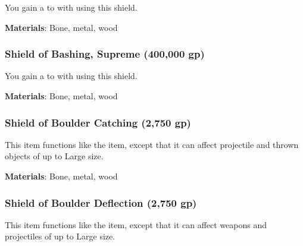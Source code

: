 You gain a   to  with  using this shield.



\vspace{0.25em}
\textbf{Materials}: Bone, metal, wood


\lowercase{\hypertarget{item:Shield of Bashing, Supreme}{}}\label{item:Shield of Bashing, Supreme}
\hypertarget{item:Shield of Bashing, Supreme}{\subsubsection{Shield of Bashing, Supreme\hfill{} (400,000 gp)}}

You gain a   to  with  using this shield.



\vspace{0.25em}
\textbf{Materials}: Bone, metal, wood


\lowercase{\hypertarget{item:Shield of Boulder Catching}{}}\label{item:Shield of Boulder Catching}
\hypertarget{item:Shield of Boulder Catching}{\subsubsection{Shield of Boulder Catching\hfill{} (2,750 gp)}}

This item functions like the  item, except that it can affect projectile and thrown objects of up to Large size.



\vspace{0.25em}
\textbf{Materials}: Bone, metal, wood


\lowercase{\hypertarget{item:Shield of Boulder Deflection}{}}\label{item:Shield of Boulder Deflection}
\hypertarget{item:Shield of Boulder Deflection}{\subsubsection{Shield of Boulder Deflection\hfill{} (2,750 gp)}}

This item functions like the  item, except that it can affect weapons and projectiles of up to Large size.



